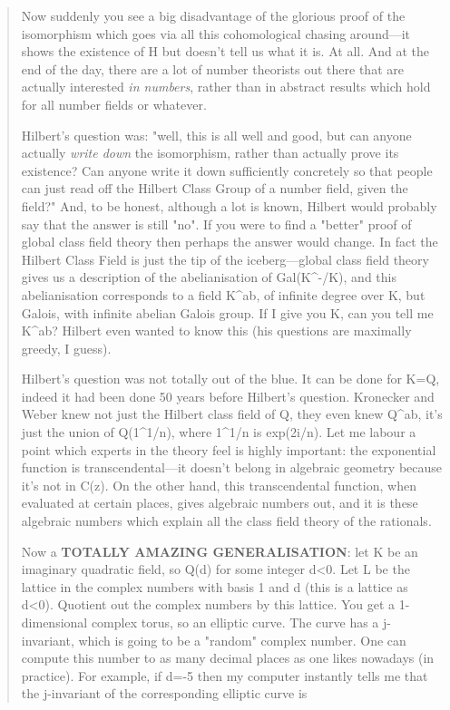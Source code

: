 \begin{quote}
 Now suddenly you see a big disadvantage of the glorious proof of the
 isomorphism which goes via all this cohomological chasing around---it
 shows the existence of H but doesn't tell us what it is. At all. And at
 the end of the day, there are a lot of number theorists out there that are
 actually interested \emph{in numbers}, rather than in abstract results which
 hold for all number fields or whatever.

 Hilbert's question was: "well, this is all well and good, but can anyone
 actually \emph{write down} the isomorphism, rather than actually prove its
 existence? Can anyone write it down sufficiently concretely so that people
 can just read off the Hilbert Class Group of a number field, given the
 field?" And, to be honest, although a lot is known, Hilbert would probably
 say that the answer is still "no". If you were to find a 
 "better" proof of
 global class field theory then perhaps the answer would change. In fact
 the Hilbert Class Field is just the tip of the iceberg---global class field
 theory gives
 us a description of the abelianisation of Gal(K^{-}/K), and this
 abelianisation corresponds to a field K^{ab}, 
 of infinite degree over K,
 but Galois, with infinite abelian Galois group. If I give you K, can
 you tell me K^{ab}? Hilbert even wanted to know this (his questions
 are maximally greedy, I guess).

 Hilbert's question was not totally out of the blue. It can be done for
 K=Q, indeed it had been done 50 years before Hilbert's question. Kronecker
 and Weber knew not just the Hilbert class field of Q, they even knew
 Q^{ab}, it's just the union of Q(1^{1/n}), 
 where 1^{1/n} is exp(2\pi i/n).
 Let me labour a point which experts in the theory feel is highly
 important: the exponential function is transcendental---it doesn't
 belong in algebraic geometry because it's not in C(z). On the other
 hand, this transcendental function, when evaluated at certain places,
 gives algebraic numbers out, and it is these algebraic numbers which
 explain all the class field theory of the rationals.
 
 Now a \textbf{TOTALLY AMAZING GENERALISATION}: let K be an imaginary quadratic
 field, so Q(\sqrt d) for some integer d<0.  Let L be the lattice in the
 complex numbers with basis 1 and \sqrt d (this is a lattice as d<0).
 Quotient out the complex numbers by this lattice.  You get a 1-dimensional 
 complex torus, so an elliptic curve. The curve has a j-invariant, which is 
 going to be a "random" complex number.  One can compute this number to as 
 many decimal places as one likes nowadays (in practice).  For example, if 
 d=-5 then my computer instantly tells me that the j-invariant of the 
 corresponding elliptic curve is


\end{quote}
